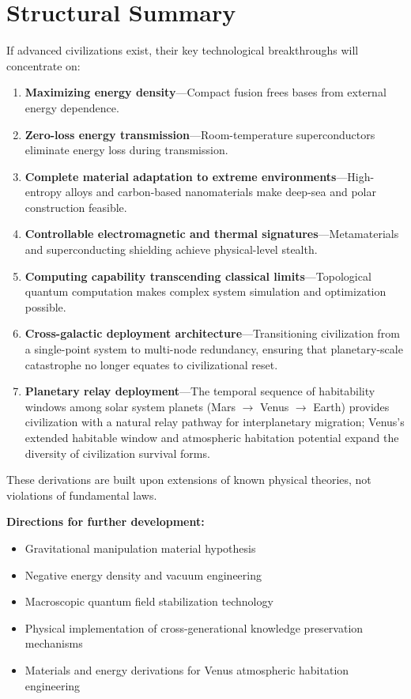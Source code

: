 \documentclass[aps,prd,twocolumn,superscriptaddress,nofootinbib]{revtex4-2}
\begin{document}
\section{Structural Summary}\label{sec:summary}

If advanced civilizations exist, their key technological breakthroughs will concentrate on:

\begin{enumerate}
  \item \textbf{Maximizing energy density}---Compact fusion frees bases from external energy dependence.
  \item \textbf{Zero-loss energy transmission}---Room-temperature superconductors eliminate energy loss during transmission.
  \item \textbf{Complete material adaptation to extreme environments}---High-entropy alloys and carbon-based nanomaterials make deep-sea and polar construction feasible.
  \item \textbf{Controllable electromagnetic and thermal signatures}---Metamaterials and superconducting shielding achieve physical-level stealth.
  \item \textbf{Computing capability transcending classical limits}---Topological quantum computation makes complex system simulation and optimization possible.
  \item \textbf{Cross-galactic deployment architecture}---Transitioning civilization from a single-point system to multi-node redundancy, ensuring that planetary-scale catastrophe no longer equates to civilizational reset.
  \item \textbf{Planetary relay deployment}---The temporal sequence of habitability windows among solar system planets (Mars $\to$ Venus $\to$ Earth) provides civilization with a natural relay pathway for interplanetary migration; Venus's extended habitable window and atmospheric habitation potential expand the diversity of civilization survival forms.
\end{enumerate}

These derivations are built upon extensions of known physical theories, not violations of fundamental laws.

\textbf{Directions for further development:}

\begin{itemize}
  \item Gravitational manipulation material hypothesis
  \item Negative energy density and vacuum engineering
  \item Macroscopic quantum field stabilization technology
  \item Physical implementation of cross-generational knowledge preservation mechanisms
  \item Materials and energy derivations for Venus atmospheric habitation engineering
\end{itemize}
\end{document}
